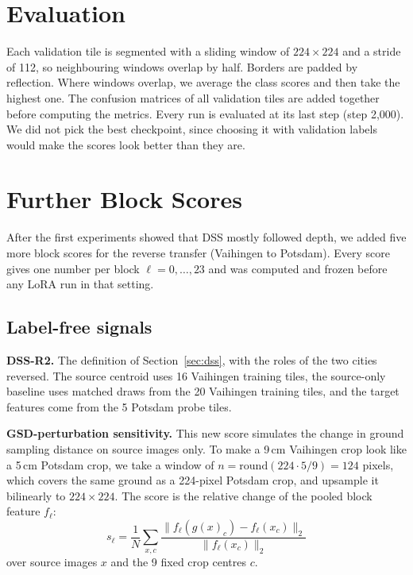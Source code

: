 \documentclass[11pt,a4paper]{report}
\begin{document}
\section{Evaluation}

Each validation tile is segmented with a sliding window of $224 \times 224$ and a stride of 112, so neighbouring windows overlap by half. Borders are padded by reflection. Where windows overlap, we average the class scores and then take the highest one. The confusion matrices of all validation tiles are added together before computing the metrics. Every run is evaluated at its last step (step 2,000). We did not pick the best checkpoint, since choosing it with validation labels would make the scores look better than they are.

\section{Further Block Scores}
\label{sec:scores}

After the first experiments showed that DSS mostly followed depth, we added five more block scores for the reverse transfer (Vaihingen to Potsdam). Every score gives one number per block $\ell = 0, \dots, 23$ and was computed and frozen before any LoRA run in that setting.

\subsection{Label-free signals}

\textbf{DSS-R2.} The definition of Section~\ref{sec:dss}, with the roles of the two cities reversed. The source centroid uses 16 Vaihingen training tiles, the source-only baseline uses matched draws from the 20 Vaihingen training tiles, and the target features come from the 5 Potsdam probe tiles.

\textbf{GSD-perturbation sensitivity.} This new score simulates the change in ground sampling distance on source images only. To make a 9\,cm Vaihingen crop look like a 5\,cm Potsdam crop, we take a window of $n = \text{round}(224 \cdot 5/9) = 124$ pixels, which covers the same ground as a 224-pixel Potsdam crop, and upsample it bilinearly to $224 \times 224$. The score is the relative change of the pooled block feature $f_\ell$:
\begin{equation}
    s_\ell = \frac{1}{N}\sum_{x,c} \frac{\lVert f_\ell(g(x)_c) - f_\ell(x_c) \rVert_2}{\lVert f_\ell(x_c) \rVert_2}
\end{equation}
over source images $x$ and the 9 fixed crop centres $c$.
\end{document}
